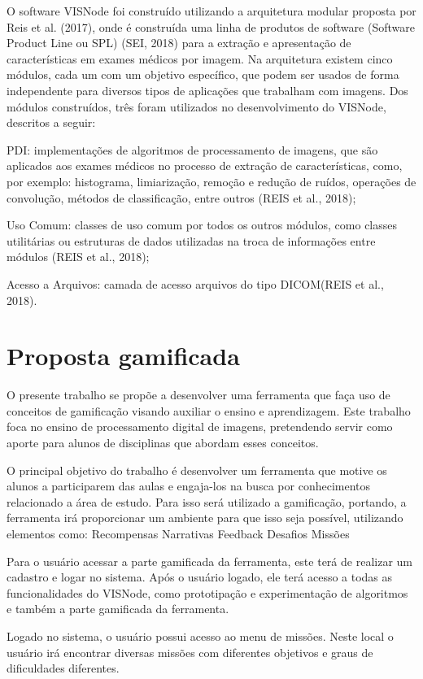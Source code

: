 \documentclass[
	12pt,				%
	oneside,			%
	a4paper,			%
	english,			%
	french,				%
	spanish,			%
	brazil,				%
	]{abntex2}
\begin{document}
O software VISNode foi construído utilizando a arquitetura modular proposta por Reis et al. (2017), onde é construída uma linha de produtos de software (Software Product Line ou SPL) (SEI, 2018)  para a extração e apresentação de características em exames médicos por imagem. Na arquitetura existem cinco módulos, cada um com um objetivo específico, que podem ser usados de forma independente para diversos tipos de aplicações que trabalham com imagens. Dos módulos construídos, três foram utilizados no desenvolvimento do VISNode, descritos a seguir:

PDI: implementações de algoritmos de processamento de imagens, que são aplicados aos exames médicos no processo de extração de características, como, por exemplo: histograma, limiarização, remoção e redução de ruídos, operações de convolução, métodos de classificação, entre outros (REIS et al., 2018); 

Uso Comum: classes de uso  comum  por todos os outros módulos, como classes utilitárias ou estruturas de dados utilizadas na troca de informações entre módulos (REIS et al., 2018); 

Acesso a Arquivos: camada de acesso arquivos do tipo DICOM(REIS et al., 2018).


\section{Proposta gamificada}


O presente trabalho se propõe a desenvolver uma ferramenta que faça uso de conceitos de gamificação visando auxiliar o ensino e aprendizagem. Este trabalho foca no ensino de processamento digital de imagens, pretendendo servir como aporte para alunos de disciplinas que abordam esses conceitos.

O principal objetivo do trabalho é desenvolver um ferramenta que motive os alunos a participarem das aulas e engaja-los na busca por conhecimentos relacionado a área de estudo. Para isso será utilizado a gamificação, portando, a ferramenta irá proporcionar um ambiente para que isso seja possível, utilizando elementos como:
Recompensas
Narrativas
Feedback
Desafios
Missões

Para o usuário acessar a parte gamificada da ferramenta, este terá de realizar um cadastro e logar no sistema. Após o usuário logado, ele terá acesso a todas as funcionalidades do VISNode, como prototipação e experimentação de algoritmos e também a parte gamificada da ferramenta.

Logado no sistema, o usuário possui acesso ao menu de missões. Neste local o usuário irá encontrar diversas missões com diferentes objetivos e graus de dificuldades diferentes.	
\end{document}
